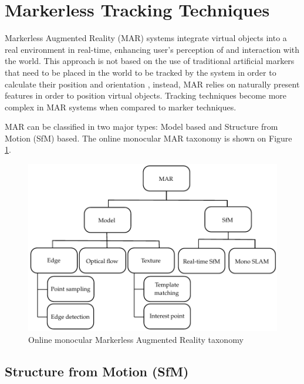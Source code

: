 \section{Markerless Tracking Techniques} %
\label{sec:basic_concepts:markerless_tracking_technique}

Markerless Augmented Reality (MAR) systems integrate virtual objects into a real environment in real-time, enhancing user's perception of and interaction with the world. This approach is not based on the use of traditional artificial markers that need to be placed in the world to be tracked by the system in order to calculate their position and orientation \cite{Teichrieb2007}, instead, MAR relies on naturally present features in order to position virtual objects. Tracking techniques become more complex in MAR systems when compared to marker techniques.

MAR can be classified in two major types: Model based and Structure from Motion (SfM) based. The online monocular MAR taxonomy is shown on Figure \ref{figure:mar_taxonomy}.

\begin{figure}[!htb]
  \centering
  \includegraphics{chapters/basic_concepts/mar_taxonomy.pdf}
  \caption{Online monocular Markerless Augmented Reality taxonomy}
  \label{figure:mar_taxonomy}
\end{figure}

\subsection{Structure from Motion (SfM)} %
\label{sub:basic_concepts:markerless_tracking_technique:sfm}

